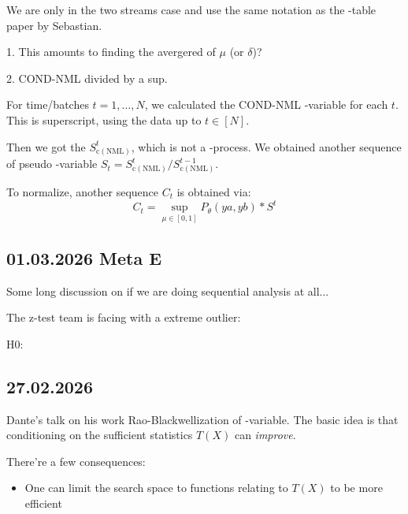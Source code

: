 We are only in the two streams case and use the same notation as the \E-table paper by Sebastian.


1. This amounts to finding the avergered of $\mu$ (or $\delta$)?

2. COND-NML divided by a sup.

For time/batches $t=1,\dots,N$, we calculated the COND-NML \E-variable for each $t$.
This is superscript, using the data up to $t\in [N]$.

Then we got the $S^t_{\mathrm{c(NML)}}$, which is not a \E-process.
We obtained another sequence of pseudo \E-variable $S_t=S^t_{\mathrm{c(NML)}}/S^{t-1}_{\mathrm{c(NML)}}$.

To normalize, another sequence $C_t$ is obtained via:
\begin{equation*}
	C_t = \sup_{\mu\in [0,1]} P_{\theta}(ya, yb) * S^t
\end{equation*}

%

\subsection*{01.03.2026 Meta E}

Some long discussion on if we are doing sequential analysis at all...

The z-test team is facing with a extreme outlier:

H0:

\subsection*{27.02.2026}

Dante's talk on his work Rao-Blackwellization of \E-variable.
The basic idea is that conditioning on the sufficient statistics $T(X)$ can \emph{improve}.

There're a few consequences:
\begin{itemize}
	\item One can limit the search space to functions relating to $T(X)$ to be more efficient
\end{itemize}


